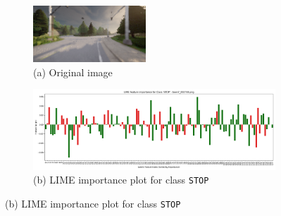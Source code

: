 \vspace{0.5em}
\begin{figure}[h]
\centering
    \begin{subfigure}{0.24\textwidth}
        \includegraphics[width=\linewidth]{img/masking/lime_on_latent/original.png}
        \caption*{(a) Original image}
    \end{subfigure}
    \hfill
    \begin{subfigure}{0.72\textwidth}
        \includegraphics[width=\linewidth]{img/masking/lime_on_latent/town7_002748.png_lime_feature_importance_class_STOP_sorted.png}
        \caption*{(b) LIME importance plot for class \texttt{STOP}}
    \end{subfigure}
    
    \vspace{0.5em}
    

\end{figure}
